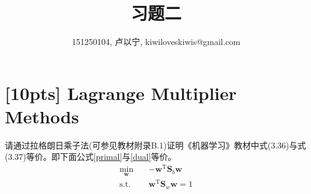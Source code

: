 \documentclass[a4paper,UTF8]{article}
\numberwithin{equation}{section}
\theoremstyle{definition}
\begin{document}
\title{习题二}
\author{151250104, 卢以宁, kiwiloveskiwis@gmail.com}
\maketitle
\section{[10pts] Lagrange Multiplier Methods}
请通过拉格朗日乘子法(可参见教材附录B.1)证明《机器学习》教材中式(3.36)与式(3.37)等价。即下面公式\eqref{primal}与\eqref{dual}等价。
\begin{equation}
\label{primal}
\begin{split}
 \min_{\mathbf{w}} \quad &-\mathbf{w}^\mathrm{T} \mathbf{S}_b\mathbf{w}\\ 
\text{s.t.} \quad &\mathbf{w}^\mathrm{T} \mathbf{S}_w\mathbf{w} = 1
\end{split}
\end{equation}
\end{document}
